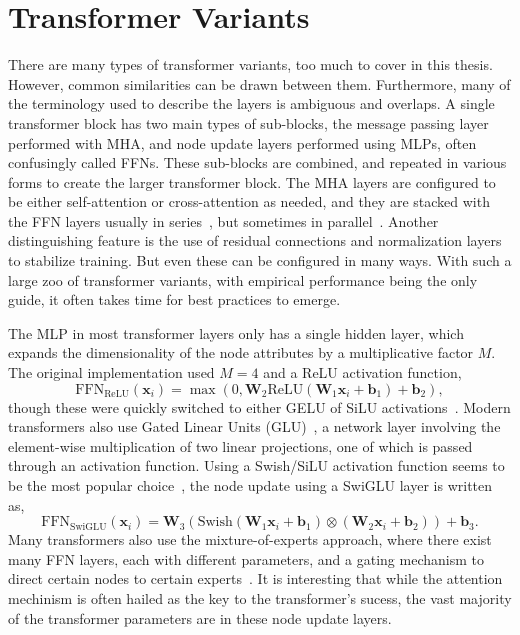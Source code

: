 \section{Transformer Variants}

There are many types of transformer variants, too much to cover in this thesis.
However, common similarities can be drawn between them.
Furthermore, many of the terminology used to describe the layers is ambiguous and overlaps.
A single transformer block has two main types of sub-blocks, the message passing layer performed with MHA, and node update layers performed using MLPs, often confusingly called FFNs.
These sub-blocks are combined, and repeated in various forms to create the larger transformer block.
The MHA layers are configured to be either self-attention or cross-attention as needed, and they are stacked with the FFN layers usually in series~, but sometimes in parallel~.
Another distinguishing feature is the use of residual connections and normalization layers to stabilize training.
But even these can be configured in many ways.
With such a large zoo of transformer variants, with empirical performance being the only guide, it often takes time for best practices to emerge.

The MLP in most transformer layers only has a single hidden layer, which expands the dimensionality of the node attributes by a multiplicative factor $M$.
The original implementation used $M=4$ and a ReLU activation function,
\begin{equation}
    \text{FFN}_\text{ReLU}(\mathbf{x}_i) = \max\left(0, \mathbf{W}_2 \text{ReLU}(\mathbf{W}_1 \mathbf{x}_i + \mathbf{b}_1) + \mathbf{b}_2\right),
\end{equation}
though these were quickly switched to either GELU of SiLU activations~.
Modern transformers also use Gated Linear Units (GLU)~, a network layer involving the element-wise multiplication of two linear projections, one of which is passed through an activation function.
Using a Swish/SiLU activation function seems to be the most popular choice~, the node update using a SwiGLU layer is written as,
\begin{equation}
    \text{FFN}_\text{SwiGLU}(\mathbf{x}_i) = \mathbf{W}_3(\text{Swish}(\mathbf{W}_1 \mathbf{x}_i + \mathbf{b}_1) \otimes (\mathbf{W}_2 \mathbf{x}_i + \mathbf{b}_2)) + \mathbf{b}_3.
\end{equation}
Many transformers also use the mixture-of-experts approach, where there exist many FFN layers, each with different parameters, and a gating mechanism to direct certain nodes to certain experts~.
It is interesting that while the attention mechinism is often hailed as the key to the transformer's sucess, the vast majority of the transformer parameters are in these node update layers.

